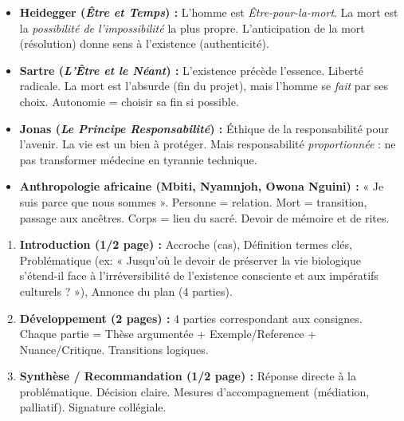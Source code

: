 \documentclass[11pt]{article}
\begin{document}
\begin{propriete}
\begin{itemize}
    \item \textbf{Heidegger (\emph{Être et Temps}) :} L'homme est \emph{Être-pour-la-mort}. La mort est la \emph{possibilité de l'impossibilité} la plus propre. L'anticipation de la mort (résolution) donne sens à l'existence (authenticité).
    \item \textbf{Sartre (\emph{L'Être et le Néant}) :} L'existence précède l'essence. Liberté radicale. La mort est l'absurde (fin du projet), mais l'homme se \emph{fait} par ses choix. Autonomie = choisir sa fin si possible.
    \item \textbf{Jonas (\emph{Le Principe Responsabilité}) :} Éthique de la responsabilité pour l'avenir. La vie est un bien à protéger. Mais responsabilité \emph{proportionnée} : ne pas transformer médecine en tyrannie technique.
    \item \textbf{Anthropologie africaine (Mbiti, Nyamnjoh, Owona Nguini) :} « Je suis parce que nous sommes ». Personne = relation. Mort = transition, passage aux ancêtres. Corps = lieu du sacré. Devoir de mémoire et de rites.
\end{itemize}
\end{propriete}

\begin{methode}
\begin{enumerate}
    \item \textbf{Introduction (1/2 page) :} Accroche (cas), Définition termes clés, Problématique (ex: « Jusqu'où le devoir de préserver la vie biologique s'étend-il face à l'irréversibilité de l'existence consciente et aux impératifs culturels ? »), Annonce du plan (4 parties).
    \item \textbf{Développement (2 pages) :} 4 parties correspondant aux consignes. Chaque partie = Thèse argumentée + Exemple/Reference + Nuance/Critique. Transitions logiques.
    \item \textbf{Synthèse / Recommandation (1/2 page) :} Réponse directe à la problématique. Décision claire. Mesures d'accompagnement (médiation, palliatif). Signature collégiale.
\end{enumerate}
\end{methode}
\end{document}
